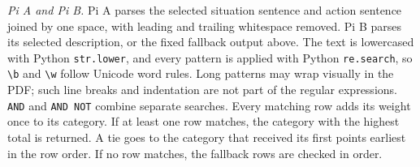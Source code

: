 \textit{Pi A and Pi B.}
Pi A parses the selected situation sentence and action sentence joined by one space, with leading and trailing whitespace removed. Pi B parses its selected description, or the fixed fallback output above. The text is lowercased with Python \texttt{str.lower}, and every pattern is applied with Python \texttt{re.search}, so \texttt{\textbackslash b} and \texttt{\textbackslash w} follow Unicode word rules. Long patterns may wrap visually in the PDF; such line breaks and indentation are not part of the regular expressions. \texttt{AND} and \texttt{AND NOT} combine separate searches. Every matching row adds its weight once to its category. If at least one row matches, the category with the highest total is returned. A tie goes to the category that received its first points earliest in the row order. If no row matches, the fallback rows are checked in order.


